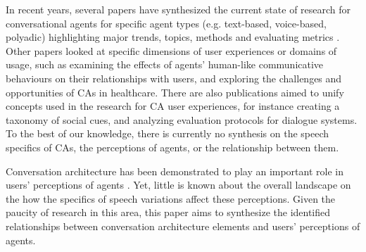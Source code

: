 In recent years, several papers have synthesized the current state of research for conversational agents for specific agent types (e.g. text-based, voice-based, polyadic) highlighting major trends, topics, methods and evaluating metrics \cite{clark2019state, rapp2021human, zheng2022ux}\cmt{[33][5]}. Other papers looked at specific dimensions of user experiences or domains of usage, such as \citet{van2020human} examining the effects of agents' human-like communicative behaviours on their relationships with users, and \citet{kocaballi2022design} exploring the challenges and opportunities of CAs in healthcare. There are also publications aimed to unify concepts used in the research for CA user experiences, for instance \citet{feine2019taxonomy} creating a taxonomy of social cues, and \citet{finch2020towards} analyzing evaluation protocols for dialogue systems. To the best of our knowledge, there is currently no synthesis on the speech specifics of CAs, the perceptions of agents, or the relationship between them.

Conversation architecture has been demonstrated to play an important role in users' perceptions of agents \cite{knijnenburg2016inferring, moussawi2021perceptions, seeger2021chatbots}\cmt{[35]}. Yet, little is known about the overall landscape on the how the specifics of speech variations affect these perceptions. Given the paucity of research in this area, this paper aims to synthesize the identified relationships between conversation architecture elements and users' perceptions of agents.


